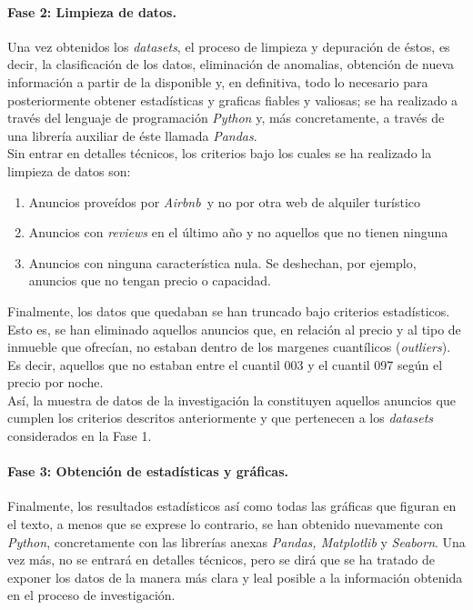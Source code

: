 \documentclass[a4paper]{article}
\newcommand*{\airbnb}{\textit{Airbnb}}
\begin{document}
        \paragraph*{\textbf{Fase 2: Limpieza de datos.}}
        Una vez obtenidos los \textit{datasets}, el proceso de limpieza y depuración de éstos, es decir, la clasificación de los datos, eliminación de 
        anomalias, obtención de nueva información a partir de la disponible y, en definitiva, todo lo necesario para posteriormente obtener estadísticas 
        y graficas fiables y valiosas; se ha realizado a través del lenguaje de programación \emph{Python} y, más concretamente, a través de una librería 
        auxiliar de éste llamada \emph{Pandas}. \\
        Sin entrar en detalles técnicos, los criterios bajo los cuales se ha realizado la limpieza de datos son:
        \begin{enumerate}
            \item Anuncios proveídos por \airbnb \ y no por otra web de alquiler turístico
            \item Anuncios con \textit{reviews} en el último año y no aquellos que no tienen ninguna
            \item Anuncios con ninguna característica nula. Se deshechan, por ejemplo, anuncios que no tengan precio o capacidad.  
        \end{enumerate}
        Finalmente, los datos que quedaban se han truncado bajo criterios estadísticos. Esto es, se han eliminado aquellos anuncios que, en relación al
        precio y al tipo de inmueble que ofrecían, no estaban dentro de los margenes cuantílicos (\textit{outliers}). Es decir, aquellos que no estaban entre
        el cuantil 003 y el cuantil 097 según el precio por noche. \\

        Así, la muestra de datos de la investigación la constituyen aquellos anuncios que cumplen los criterios descritos anteriormente y que 
        pertenecen a los \textit{datasets} considerados en la Fase 1.

    \newpage

        \paragraph*{\textbf{Fase 3: Obtención de estadísticas y gráficas.}}
        Finalmente, los resultados estadísticos así como todas las gráficas que figuran en 
        el texto, a menos que se exprese lo contrario, se han obtenido nuevamente con \emph{Python}, concretamente con las librerías anexas \emph{Pandas, 
        Matplotlib} y \emph{Seaborn}. Una vez más, no se entrará en detalles técnicos, pero se dirá que se ha tratado de exponer los datos de la manera más 
        clara y leal posible a la información obtenida en el proceso de investigación. \\
\end{document}
